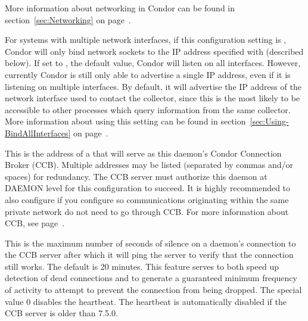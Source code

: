More information about networking in Condor can be found in
section~\ref{sec:Networking} on page~\pageref{sec:Networking}.

\begin{description}

\label{param:BindAllInterfaces}
\item[\Macro{BIND\_ALL\_INTERFACES}]
  For systems with multiple network interfaces, if this configuration
  setting is , Condor will only bind network sockets to 
  the IP address specified with
   (described below).  If set to ,
  the default value, Condor will listen on all interfaces.
  However, currently Condor is still only able to advertise a single
  IP address, even if it is listening on multiple interfaces.  By
  default, it will advertise the IP address of the network interface
  used to contact the collector, since this is the most likely to be
  accessible to other processes which query information from the same
  collector.
  More information about using this setting can be found in
  section~\ref{sec:Using-BindAllInterfaces} on
  page~\pageref{sec:Using-BindAllInterfaces}. 

\label{param:CcbAddress}
\item[\Macro{CCB\_ADDRESS}] This is the address of a
   that will serve as this daemon's Condor
  Connection Broker (CCB).  Multiple addresses may be listed
  (separated by commas and/or spaces) for redundancy.  The CCB server
  must authorize this daemon at DAEMON level for this configuration to
  succeed.  It is highly recommended to also configure
   if you configure 
  so communications originating within the same private network do not
  need to go through CCB.  For more information about CCB,
  see page~\pageref{sec:CCB}.

\label{param:CcbHeartbeatInterval}
\item[\Macro{CCB\_HEARTBEAT\_INTERVAL}] This is the maximum
  number of seconds of silence on a daemon's connection to the CCB server
  after which it will ping the server to verify that the connection still
  works.  The default is 20 minutes.  This feature serves to both speed
  up detection of dead connections and to generate a guaranteed minimum
  frequency of activity to attempt to prevent the connection from being
  dropped.  The special value 0 disables the heartbeat.  The heartbeat
  is automatically disabled if the CCB server is older than 7.5.0.


\end{description}
